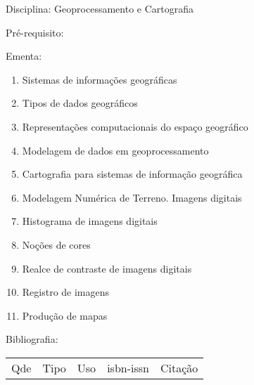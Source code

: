 \documentclass[12pt,a4paper,twoside]{report}
\begin{document}
Disciplina: Geoprocessamento e Cartografia

Pré-requisito:
\begin{enumerate}
\end{enumerate}

Ementa:
\begin{enumerate}
\item Sistemas de informações geográficas
\item Tipos de dados geográficos
\item Representações computacionais do espaço geográfico
\item Modelagem de dados em geoprocessamento
\item Cartografia para sistemas de informação geográfica
\item Modelagem Numérica de Terreno. Imagens digitais
\item Histograma de imagens digitais
\item Noções de cores
\item Realce de contraste de imagens digitais
\item Registro de imagens
\item Produção de mapas
\end{enumerate}

Bibliografia:
\begin{tabular}{lllll}
Qde & Tipo & Uso & isbn-issn & Citação \\
\end{tabular}
\end{document}
